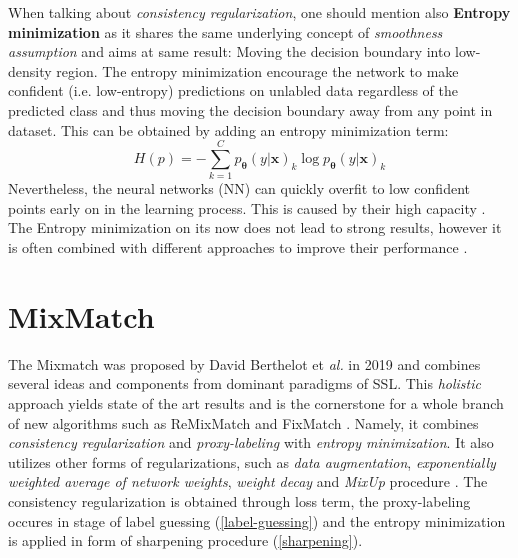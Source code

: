 When talking about \textit{consistency regularization}, one should mention also \textbf{Entropy minimization}\cite{entropy-min-2004} as it shares the same underlying concept
of \textit{smoothness assumption} and aims at same result: Moving the decision boundary into low-density region. The entropy minimization encourage the 
network to make confident (i.e. low-entropy) predictions on unlabled data regardless of the predicted class and thus moving the decision boundary away from any point in dataset.
This can be obtained by adding an entropy minimization term:
\begin{equation*}
    H(p) = -\sum_{k=1}^{C} p_\mathbf{\theta}(y|\mathbf{x})_k \log p_\mathbf{\theta}(y|\mathbf{x})_k
\end{equation*}
Nevertheless, the neural networks (NN) can quickly overfit to low confident points early on in the learning process. This is caused by their high capacity \cite{how-to-evalute-ssl-2018}.
The Entropy minimization on its now does not lead to strong results, however it is often combined with different approaches to improve their performance \cite{ssl-overview-2020}.

\section{MixMatch}
\label{sec:mix-match}
The Mixmatch was proposed by David Berthelot et \textit{al.} in 2019 \cite{mixmatch-2019} and combines several ideas and components from dominant paradigms of SSL.
This \textit{holistic} approach yields state of the art results and is the cornerstone for a whole branch of new algorithms such as ReMixMatch \cite{remixmatch-2020}
and FixMatch \cite{fixmatch-2020}. Namely, it combines \textit{consistency regularization} and \textit{proxy-labeling} with \textit{entropy minimization}.
It also utilizes other forms of regularizations, such as \textit{data augmentation}, \textit{exponentially weighted average of network weights}\cite{mean-teacher-2018},
\textit{weight decay} \cite{weight-decay-2019} and \textit{MixUp} procedure \cite{mixup-2018}. The consistency regularization is obtained through loss term, the 
proxy-labeling occures in stage of label guessing (\ref{label-guessing}) and the entropy minimization is applied in form of sharpening procedure (\ref{sharpening}).

